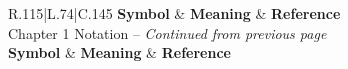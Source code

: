 \documentclass[../dissertation.tex]{subfiles}
\begin{document}
\begin{centering}
\begin{longtable}{R{.115\textwidth}|L{.74\textwidth}|C{.145\textwidth}}
	\textbf{Symbol} & \textbf{Meaning} & \textbf{Reference} \\
	\hline                                      
	\endfirsthead
	{Chapter 1 Notation -- \textit{Continued from previous page}} \\
	\hline
	\textbf{Symbol} & \textbf{Meaning} & \textbf{Reference} \\
	\hline
	\endhead
	\hline {} \\
	\endfoot
	\hline
	\endlastfoot

\end{longtable}
\end{centering}
\end{document}
